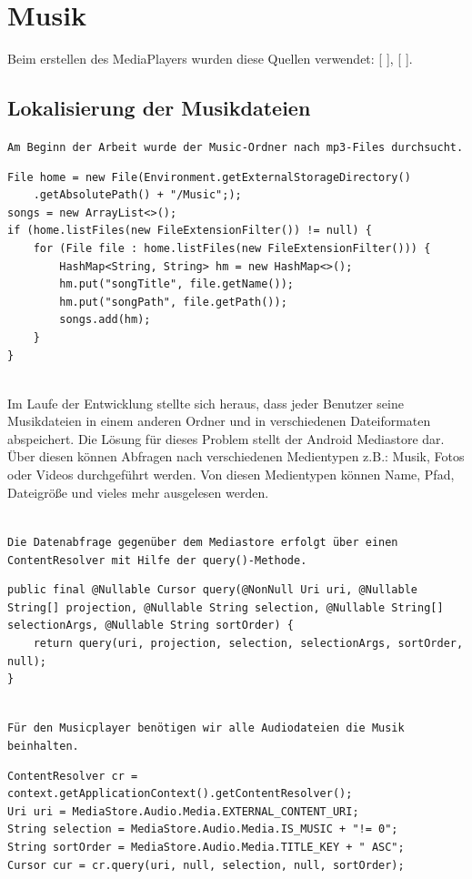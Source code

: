 \documentclass[FIPLY_base.tex]{subfiles}
\author{Andreas Denkmayr}
\date{19. Februar 2016}
\begin{document}
\section{Musik}
Beim erstellen des MediaPlayers wurden diese Quellen verwendet: [ \cite{adMediaPlayer}], [ \cite{bMediaPlayer}]. %
\subsection{Lokalisierung der Musikdateien}
\texttt{Am Beginn der Arbeit wurde der Music-Ordner nach mp3-Files durchsucht.}  
\begin{lstlisting}
File home = new File(Environment.getExternalStorageDirectory()
	.getAbsolutePath() + "/Music";);
songs = new ArrayList<>();
if (home.listFiles(new FileExtensionFilter()) != null) {
	for (File file : home.listFiles(new FileExtensionFilter())) {
		HashMap<String, String> hm = new HashMap<>();
		hm.put("songTitle", file.getName());
		hm.put("songPath", file.getPath());
		songs.add(hm);
	}
}    
\end{lstlisting}

\ \\
Im Laufe der Entwicklung stellte sich heraus, dass jeder Benutzer seine Musikdateien in einem anderen Ordner und in verschiedenen Dateiformaten abspeichert. 
Die Lösung für dieses Problem stellt der Android Mediastore dar. 
Über diesen können Abfragen nach verschiedenen Medientypen z.B.: Musik, Fotos oder Videos durchgeführt werden. Von diesen Medientypen können Name, Pfad, Dateigröße und vieles mehr ausgelesen werden.
  
\ \\  
\texttt{Die Datenabfrage gegenüber dem Mediastore erfolgt über einen ContentResolver mit Hilfe der query()-Methode.}  
\begin{lstlisting}
public final @Nullable Cursor query(@NonNull Uri uri, @Nullable String[] projection, @Nullable String selection, @Nullable String[] selectionArgs, @Nullable String sortOrder) {
	return query(uri, projection, selection, selectionArgs, sortOrder, null);
}
\end{lstlisting}

\ \\
\texttt{Für den Musicplayer benötigen wir alle Audiodateien die Musik beinhalten.}
\begin{lstlisting}
ContentResolver cr = context.getApplicationContext().getContentResolver();
Uri uri = MediaStore.Audio.Media.EXTERNAL_CONTENT_URI;
String selection = MediaStore.Audio.Media.IS_MUSIC + "!= 0";
String sortOrder = MediaStore.Audio.Media.TITLE_KEY + " ASC";
Cursor cur = cr.query(uri, null, selection, null, sortOrder);
\end{lstlisting}
\end{document}
